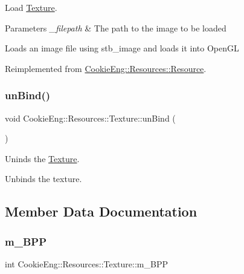 Load \hyperlink{class_cookie_eng_1_1_resources_1_1_texture}{Texture}. 


\begin{DoxyParams}{Parameters}
{\em \+\_\+filepath} & The path to the image to be loaded\\
\hline
\end{DoxyParams}
Loads an image file using stb\+\_\+image and loads it into Open\+GL 

Reimplemented from \hyperlink{class_cookie_eng_1_1_resources_1_1_resource_a75648b8f2e442bebc90d6eb4ea3a2f6e}{Cookie\+Eng\+::\+Resources\+::\+Resource}.

\mbox{\label{class_cookie_eng_1_1_resources_1_1_texture_a1af11a58e5dc08fa18baeba8cee62109}} 
\subsubsection{\texorpdfstring{un\+Bind()}{unBind()}}
{\footnotesize\ttfamily void Cookie\+Eng\+::\+Resources\+::\+Texture\+::un\+Bind (\begin{DoxyParamCaption}{ }\end{DoxyParamCaption})\hspace{0.3cm}{\ttfamily [inline]}}



Uninds the \hyperlink{class_cookie_eng_1_1_resources_1_1_texture}{Texture}. 

Unbinds the texture. 

\subsection{Member Data Documentation}
\mbox{\label{class_cookie_eng_1_1_resources_1_1_texture_ac873fd6475f9059603f79e389089ad48}} 
\subsubsection{\texorpdfstring{m\+\_\+\+B\+PP}{m\_BPP}}
{\footnotesize\ttfamily int Cookie\+Eng\+::\+Resources\+::\+Texture\+::m\+\_\+\+B\+PP\hspace{0.3cm}{\ttfamily [protected]}}

